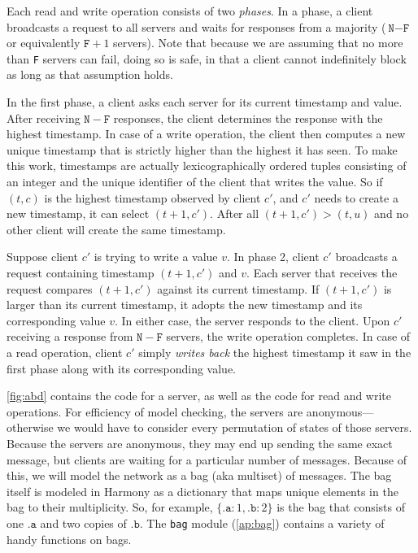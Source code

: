 \documentclass{report}
\begin{document}
Each read and write operation consists of two \emph{phases}.  In a phase,
a client broadcasts a request to all servers and waits for responses
from a majority ($\texttt{N} - \texttt{F}$ or equivalently
$\texttt{F} + 1$ servers).  Note that because we are assuming that no
more than \texttt{F} servers can fail, doing so is safe, in that a client
cannot indefinitely block as long as that assumption holds.

In the first phase, a client asks each server for its current
timestamp and value.  After receiving $\mathtt{N} - \mathtt{F}$ responses,
the client determines the response with the highest timestamp.
In case of a write operation, the client then computes a new unique
timestamp that is strictly higher than the highest it has seen.
To make this work, timestamps are actually lexicographically ordered
tuples consisting of an integer and the unique identifier of the
client that writes the value.  So if $(t, c)$ is the highest timestamp
observed by client $c'$, and $c'$  needs to create a new timestamp,
it can select $(t + 1, c')$.
After all $(t + 1, c') > (t, u)$ and no other client
will create the same timestamp.

Suppose client $c'$ is trying to write a value $v$.
In phase 2, client $c'$ broadcasts a request containing timestamp $(t+1, c')$
and $v$.  Each server that receives the request compares $(t+1, c')$ against
its current timestamp.  If $(t+1, c')$ is larger than its current timestamp,
it adopts the new timestamp and its corresponding value $v$.  In either case,
the server responds to the client.
Upon $c'$ receiving a response from $\mathtt{N} - \mathtt{F}$ servers,
the write operation completes.
In case of a read operation, client $c'$ simply \emph{writes back} the
highest timestamp it saw in the first phase along with its corresponding value.

\autoref{fig:abd} contains the code for a server, as well as the code
for read and write operations.
For efficiency of model checking, the servers are anonymous---otherwise
we would have to consider every permutation of states of those servers.
Because the servers are anonymous, they may end up sending the same
exact message, but clients are waiting for a particular number of
messages.
Because of this, 
we will model the network as a bag (aka multiset) of messages.
The bag itself is
modeled in Harmony as a dictionary that maps unique elements in the bag to their
multiplicity.  So, for example, $\{ .\texttt{a}:1, .\texttt{b}:2 \}$ is the bag that consists of
one $.\texttt{a}$ and two copies of $.\texttt{b}$.
The \texttt{bag} module (\autoref{ap:bag}) contains a variety of handy functions on bags.
\end{document}
